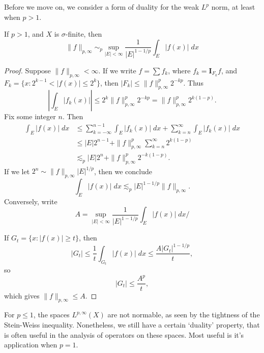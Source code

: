 Before we move on, we consider a form of duality for the weak $L^p$ norm, at least when $p > 1$.

\begin{theorem}
	If $p > 1$, and $X$ is $\sigma$-finite, then
	\[ \| f \|_{p,\infty} \sim_p \sup_{|E| < \infty} \frac{1}{|E|^{1-1/p}} \int_E |f(x)|\; dx \]
\end{theorem}
\begin{proof}
	Suppose $\| f \|_{p,\infty} < \infty$. If we write $f = \sum f_k$, where $f_k = \mathbf{I}_{F_k} f$, and $F_k = \{ x: 2^{k-1} < |f(x)| \leq 2^k \}$, then $|F_k| \leq \| f \|_{p,\infty}^p 2^{-kp}$. Thus
	\[ \left| \int_E |f_k(x)| \right| \leq 2^k \| f \|_{p,\infty}^p 2^{-kp} = \| f \|_{p,\infty}^p 2^{k(1-p)}. \]
	Fix some integer $n$. Then
	\begin{align*}
		\int_E |f(x)|\; dx &\leq \sum_{k = -\infty}^{n-1} \int_E |f_k(x)|\; dx + \sum_{k = n}^\infty \int_E |f_k(x)|\; dx\\
		&\leq |E| 2^{n-1} + \| f \|_{p,\infty}^p \sum_{k = n}^\infty 2^{k(1-p)}\\
		&\lesssim_p |E| 2^n + \| f \|_{p,\infty}^p 2^{-k(1-p)}.
	\end{align*}
	If we let $2^n \sim \| f \|_{p,\infty} |E|^{1/p}$, then we conclude
	\[ \int_E |f(x)|\; dx \lesssim_p |E|^{1 - 1/p} \| f \|_{p,\infty}. \]
	Conversely, write
	\[ A = \sup_{|E| < \infty} \frac{1}{|E|^{1-1/p}} \int_E |f(x)|\; dx/ \]

	If $G_t = \{ x: |f(x)| \geq t \}$, then
	\[ |G_t| \leq \frac{1}{t} \int_{G_t} |f(x)|\; dx \leq \frac{A |G_t|^{1 - 1/p}}{t}, \]
	so
	\[ |G_t| \leq \frac{A^p}{t}, \]
	which gives $\| f \|_{p,\infty} \leq A$.
\end{proof}

For $p \leq 1$, the spaces $L^{p,\infty}(X)$ are not normable, as seen by the tightness of the Stein-Weiss inequality. Nonetheless, we still have a certain `duality' property, that is often useful in the analysis of operators on these spaces. Most useful is it's application when $p = 1$.


